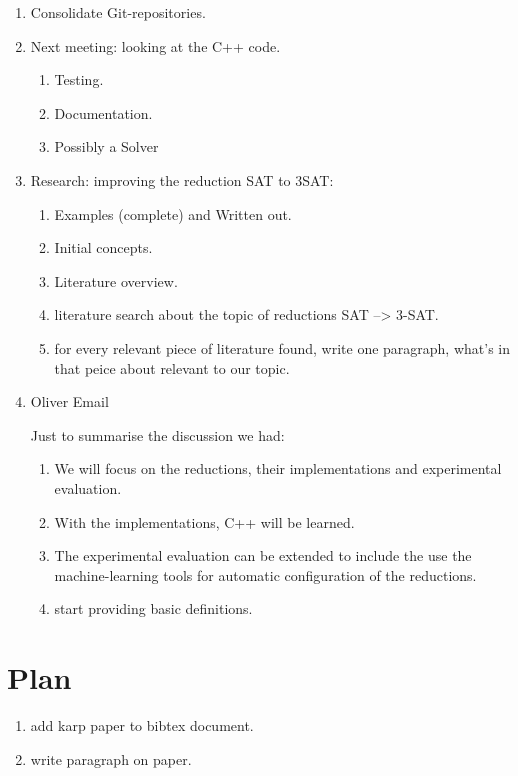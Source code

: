 \documentclass[a4paper]{report}
\begin{document}
\begin{enumerate}
\item Consolidate Git-repositories.
\item Next meeting: looking at the C++ code.
  \begin{enumerate}
  \item Testing.
  \item Documentation.
  \item Possibly a Solver
  \end{enumerate}
\item Research: improving the reduction SAT to 3SAT:
  \begin{enumerate}
  \item Examples (complete) and Written out.
  \item Initial concepts.
  \item Literature overview.
  \item literature search about the topic of reductions SAT --> 3-SAT.
  \item for every relevant piece of literature found, write one paragraph, what's in that peice about relevant to our topic.
  \end{enumerate}
\item Oliver Email

  Just to summarise the discussion we had:
  \begin{enumerate}
     \item We will focus on the reductions, their implementations and experimental evaluation.
    \item With the implementations, C++ will be learned.
    \item The experimental evaluation can be extended to include the use the machine-learning tools for automatic configuration of the reductions.
    \item start providing basic definitions.
  \end{enumerate}
\end{enumerate}



\section{Plan}
\label{sec:Plan}

\begin{enumerate}
\item add karp paper to bibtex document.\cite{Karp1972NP}
\item write paragraph on paper.

\end{enumerate}
\end{document}
